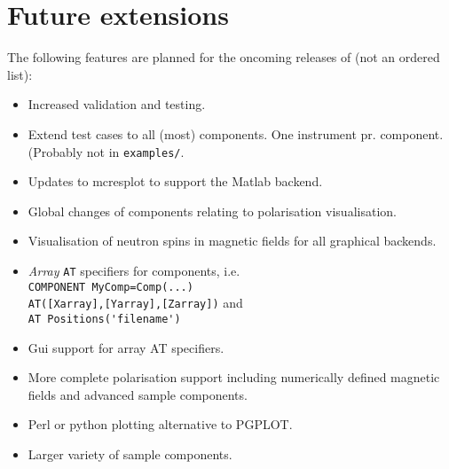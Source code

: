 \section{Future extensions}
\label{s:future}
The following features are planned for the oncoming releases of \MCS
(not an ordered list):
\begin{itemize}
\item Increased validation and testing.
\item Extend test cases to all (most) components. One instrument
  pr. component. (Probably not in \verb+examples/+.
\item Updates to mcresplot to support the Matlab backend.
\item Global changes of components relating to polarisation
  visualisation.
\item Visualisation of neutron spins in magnetic fields for all
  graphical backends.
\item \emph{Array} \verb+AT+ specifiers for components, i.e. \\
  \verb+COMPONENT MyComp=Comp(...)+\\\verb+AT([Xarray],[Yarray],[Zarray])+ and\\
  \verb+AT Positions('filename')+
\item Gui support for array AT specifiers.
\item More complete polarisation support including numerically defined
  magnetic fields and advanced sample components.
\item Perl or python plotting alternative to PGPLOT.
\item Larger variety of sample components.
\end{itemize}









